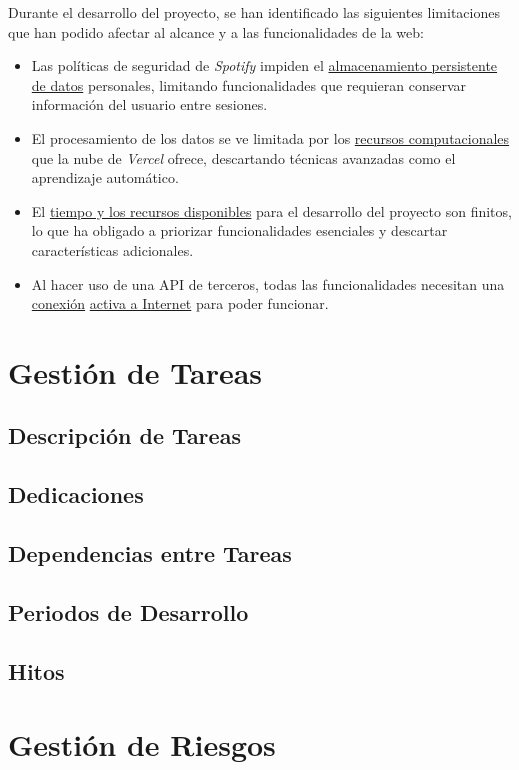 Durante el desarrollo del proyecto, se han identificado las siguientes limitaciones que han podido afectar al alcance y a las funcionalidades de la web:

\begin{itemize}
    \item Las políticas de seguridad de \textit{Spotify} impiden el \underline{almacenamiento persistente de datos} personales, limitando funcionalidades que requieran conservar información del usuario entre sesiones.

    \item El procesamiento de los datos se ve limitada por los \underline{recursos computacionales} que la nube de \textit{Vercel} ofrece, descartando técnicas avanzadas como el aprendizaje automático.

    \item El \underline{tiempo y los recursos disponibles} para el desarrollo del proyecto son finitos, lo que ha obligado a priorizar funcionalidades esenciales y descartar características adicionales.

    \item Al hacer uso de una API de terceros, todas las funcionalidades necesitan una \underline{conexión} \underline{activa a Internet} para poder funcionar.
\end{itemize}

\section{Gestión de Tareas}
\subsection{Descripción de Tareas}
\subsection{Dedicaciones}
\subsection{Dependencias entre Tareas}
\subsection{Periodos de Desarrollo}
\subsection{Hitos}

\section{Gestión de Riesgos}

